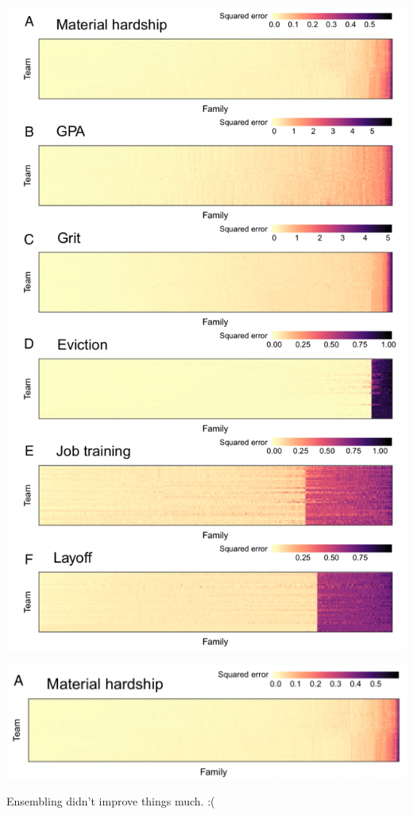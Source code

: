 \documentclass[aspectratio=169]{beamer}
\begin{document}
\begin{frame}

\begin{center}
\includegraphics[height=0.9\textheight]{figures/salganik_measuring_2020_fig4}
\end{center}

\end{frame}
\begin{frame}

\begin{center}
\includegraphics[width=\textwidth]{figures/salganik_measuring_2020_fig4a}
\end{center}

\vfill
Ensembling didn't improve things much. :(

\end{frame}
\end{document}
